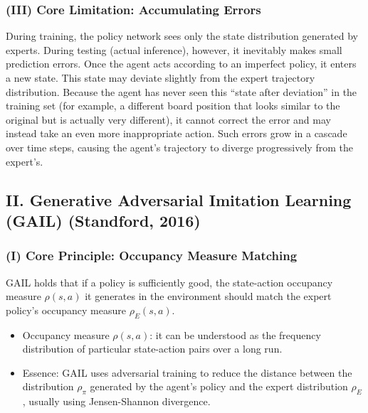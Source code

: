 \hypertarget{iii-core-limitation-accumulating-errors}{%
\subsubsection{(III) Core Limitation: Accumulating Errors}\label{iii-core-limitation-accumulating-errors}}

During training, the policy network sees only the state distribution generated by experts. During testing (actual inference), however, it inevitably makes small prediction errors. Once the agent acts according to an imperfect policy, it enters a new state. This state may deviate slightly from the expert trajectory distribution. Because the agent has never seen this ``state after deviation'' in the training set (for example, a different board position that looks similar to the original but is actually very different), it cannot correct the error and may instead take an even more inappropriate action. Such errors grow in a cascade over time steps, causing the agent's trajectory to diverge progressively from the expert's.

\hypertarget{ii.-generative-adversarial-imitation-learning-gail-standford-2016}{%
\subsection{II. Generative Adversarial Imitation Learning (GAIL) (Standford, 2016)}\label{ii.-generative-adversarial-imitation-learning-gail-standford-2016}}

\hypertarget{i-core-principle-occupancy-measure-matching}{%
\subsubsection{(I) Core Principle: Occupancy Measure Matching}\label{i-core-principle-occupancy-measure-matching}}

GAIL holds that if a policy is sufficiently good, the state-action occupancy measure \(\rho(s,a)\) it generates in the environment should match the expert policy's occupancy measure \(\rho_E(s,a)\).

\begin{itemize}
\tightlist
\item
  Occupancy measure \(\rho(s,a)\): it can be understood as the frequency distribution of particular state-action pairs over a long run.
\item
  Essence: GAIL uses adversarial training to reduce the distance between the distribution \(\rho_\pi\) generated by the agent's policy and the expert distribution \(\rho_E\), usually using Jensen-Shannon divergence.
\end{itemize}

